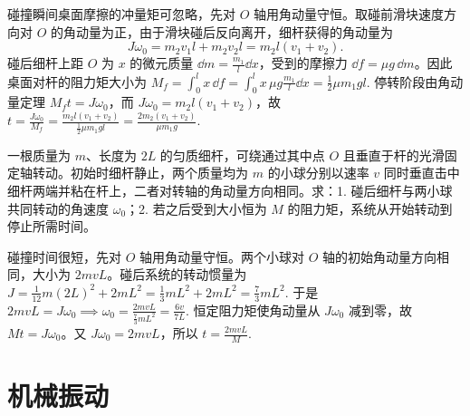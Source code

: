 \documentclass[lang=cn,11pt]{elegantbook}
\begin{document}
\begin{solution}
碰撞瞬间桌面摩擦的冲量矩可忽略，先对 \(O\) 轴用角动量守恒。取碰前滑块速度方向对 \(O\) 的角动量为正，由于滑块碰后反向离开，细杆获得的角动量为
\[
J\omega_0=m_2v_1l+m_2v_2l=m_2l(v_1+v_2).
\]
碰后细杆上距 \(O\) 为 \(x\) 的微元质量 \(\dd m=\frac{m_1}{l}\dd x\)，受到的摩擦力 \(\dd f=\mu g\,\dd m\)。因此桌面对杆的阻力矩大小为
 \(M_f=\int_0^l x\,\dd f =\int_0^l x\,\mu g\frac{m_1}{l}\dd x =\frac12\mu m_1gl.\) 
停转阶段由角动量定理 \(M_ft=J\omega_0\)，而 \(J\omega_0=m_2l(v_1+v_2)\)，故
 \(t=\frac{J\omega_0}{M_f} =\frac{m_2l(v_1+v_2)}{\frac12\mu m_1gl} =\frac{2m_2(v_1+v_2)}{\mu m_1g}.\) 
\end{solution}

\begin{exercise}
一根质量为 \(m\)、长度为 \(2L\) 的匀质细杆，可绕通过其中点 \(O\) 且垂直于杆的光滑固定轴转动。初始时细杆静止，两个质量均为 \(m\) 的小球分别以速率 \(v\) 同时垂直击中细杆两端并粘在杆上，二者对转轴的角动量方向相同。求：1. 碰后细杆与两小球共同转动的角速度 \(\omega_0\)；2. 若之后受到大小恒为 \(M\) 的阻力矩，系统从开始转动到停止所需时间。
\end{exercise}

\begin{solution}
碰撞时间很短，先对 \(O\) 轴用角动量守恒。两个小球对 \(O\) 轴的初始角动量方向相同，大小为 \(2mvL\)。碰后系统的转动惯量为
 \(J=\frac{1}{12}m(2L)^2+2mL^2 =\frac13mL^2+2mL^2 =\frac73mL^2.\) 
于是
 \(2mvL=J\omega_0 \implies \omega_0=\frac{2mvL}{\frac73mL^2} =\frac{6v}{7L}.\) 
恒定阻力矩使角动量从 \(J\omega_0\) 减到零，故 \(Mt=J\omega_0\)。又 \(J\omega_0=2mvL\)，所以
 \(t=\frac{2mvL}{M}.\) 
\end{solution}


\chapter{机械振动}
\end{document}
